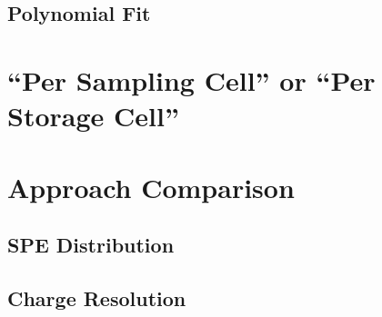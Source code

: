 \subsection{Polynomial Fit}

\section{``Per Sampling Cell'' or ``Per Storage Cell''}

\section{Approach Comparison}

\subsection{SPE Distribution}

\subsection{Charge Resolution}
